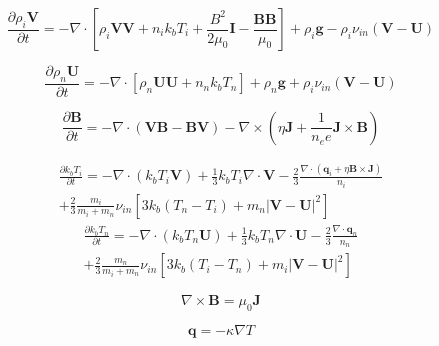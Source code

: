 \documentclass[12pt,upcase]{umlthesis}
\begin{document}
\begin{equation}\label{eq:plasmamomentum}
	\frac{\partial \rho_i \textbf{V}}{\partial t} = - \nabla \cdot [\rho_i \textbf{VV} + n_i k_b T_i + \frac{B^2}{2 \mu_0}\textbf{I} - \frac{\textbf{BB}}{\mu_0}] + \rho_i \textbf{g} - \rho_i \nu_{in} (\textbf{V} - \textbf{U})
\end{equation}

\begin{equation}\label{eq:neutralmomentum}
	\frac{\partial \rho_n \textbf{U}}{\partial t} = - \nabla \cdot [\rho_n \textbf{UU} + n_n k_b T_n] + \rho_n \textbf{g} + \rho_i \nu_{in} (\textbf{V} - \textbf{U})
\end{equation}

\begin{equation}
	\frac{\partial \textbf{B}}{\partial t} = - \nabla \cdot ( \textbf{VB} - \textbf{BV} ) - \nabla \times ( \eta \textbf{J}  + \frac{1}{n_e e} \textbf{J} \times \textbf{B} )
\end{equation}

\begin{equation}\label{eq:energyion}
\begin{aligned}
	\frac{\partial k_b T_i}{\partial t} = - \nabla \cdot (k_b T_i \textbf{V}) + \frac{1}{3} k_b T_i \nabla \cdot \textbf{V} - \frac{2}{3} \frac{\nabla \cdot (\textbf{q}_i + \eta \textbf{B} \times \textbf{J})}{n_i} \\
	+ \frac{2}{3} \frac{m_i}{m_i+m_n} \nu_{in} [3 k_b (T_n - T_i) + m_n | \textbf{V} - \textbf{U} |^{2} ]
\end{aligned}
\end{equation}
\begin{equation}\label{eq:energyneutral}
\begin{aligned}
	\frac{\partial k_b T_n}{\partial t} = - \nabla \cdot (k_b T_n \textbf{U}) + \frac{1}{3} k_b T_n \nabla \cdot \textbf{U} - \frac{2}{3} \frac{\nabla \cdot \textbf{q}_n}{n_n} \\
	+ \frac{2}{3} \frac{m_n}{m_i+m_n}  \nu_{in} [ 3 k_b (T_i - T_n) + m_i | \textbf{V} - \textbf{U}|^{2} ]
\end{aligned}
\end{equation}

\begin{equation}
	\nabla \times \textbf{B} = \mu_0 \textbf{J}
\end{equation}

\begin{equation}
	\textbf{q} = - \kappa \nabla T
\end{equation}
\end{document}
